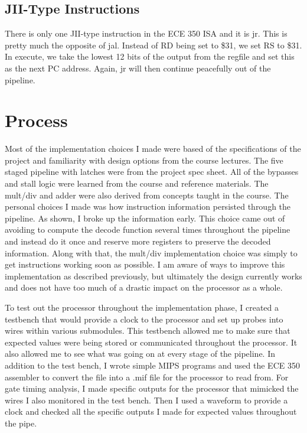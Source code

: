 \documentclass[letterpaper]{article} %
\begin{document}
\subsection*{JII-Type Instructions}

There is only one JII-type instruction in the ECE 350 ISA and it is jr. This is pretty much the opposite of jal. Instead of RD being set to \$31, we set RS to \$31. In execute, we take the lowest 12 bits of the output from the regfile and set this as the next PC address. Again, jr will then continue peacefully out of the pipeline.

\section*{Process}

Most of the implementation choices I made were based of the specifications of the project and familiarity with design options from the course lectures. The five staged pipeline with latches were from the project spec sheet. All of the bypasses and stall logic were learned from the course and reference materials. The mult/div and adder were also derived from concepts taught in the course. The personal choices I made was how instruction information persisted through the pipeline. As shown, I broke up the information early. This choice came out of avoiding to compute the decode function several times throughout the pipeline and instead do it once and reserve more registers to preserve the decoded information. Along with that, the mult/div implementation choice was simply to get instructions working soon as possible. I am aware of ways to improve this implementation as described previously, but ultimately the design currently works and does not have too much of a drastic impact on the processor as a whole.

To test out the processor throughout the implementation phase, I created a testbench that would provide a clock to the processor and set up probes into wires within various submodules. This testbench allowed me to make sure that expected values were being stored or communicated throughout the processor. It also allowed me to see what was going on at every stage of the pipeline. In addition to the test bench, I wrote simple MIPS programs and used the ECE 350 assembler to convert the file into a .mif file for the processor to read from. For gate timing analysis, I made specific outputs for the processor that mimicked the wires I also monitored in the test bench. Then I used a waveform to provide a clock and checked all the specific outputs I made for expected values throughout the pipe.
\end{document}

